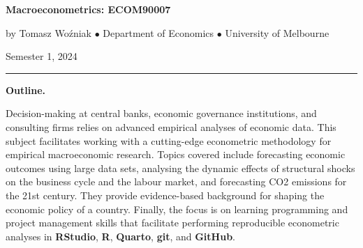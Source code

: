 \documentclass[10pt]{article}
\begin{document}


\bigskip\noindent\textbf{\LARGE Macroeconometrics: ECOM90007}

\smallskip\noindent by Tomasz Wo\'zniak $\bullet$ Department of Economics $\bullet$  University of Melbourne

\smallskip\noindent Semester 1, 2024

\smallskip\noindent\rule{5cm}{.1pt}

\normalsize
\smallskip\noindent\textbf{Outline.} 

\noindent Decision-making at central banks, economic governance institutions, and consulting firms relies on advanced empirical analyses of economic data. This subject facilitates working with a cutting-edge econometric methodology for empirical macroeconomic research. Topics covered include forecasting economic outcomes using large data sets, analysing the dynamic effects of structural shocks on the business cycle and the labour market, and forecasting CO2 emissions for the 21st century. They provide evidence-based background for shaping the economic policy of a country. Finally, the focus is on learning programming and project management skills that facilitate performing reproducible econometric analyses in \textbf{RStudio}, \textbf{R}, \textbf{Quarto}, \textbf{git}, and \textbf{GitHub}.
\end{document}
